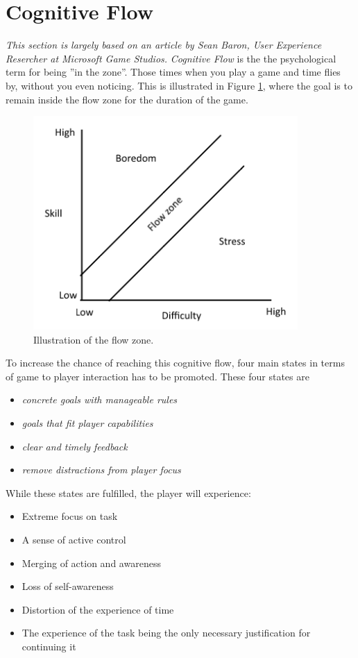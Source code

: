 \section{Cognitive Flow}\label{gamedesign:cognitiveflow}
\emph{This section is largely based on an article by Sean Baron, User Experience Resercher at Microsoft Game Studios\cite{baron}.}
\emph{Cognitive Flow} is the the psychological term for being ''in the zone''. Those times when you play a game and time flies by, without you even noticing. 
This is illustrated in Figure \ref{gamedesign:flowzone}, where the goal is to remain inside the flow zone for the duration of the game.
\begin{figure}
\includegraphics{figures/gamedesign/flowZone}
\caption{Illustration of the flow zone.}
\label{gamedesign:flowzone}
\end{figure}

To increase the chance of reaching this cognitive flow, four main states in terms of game to player interaction has to be promoted. 
These four states are 
\begin{itemize}
\item \emph{concrete goals with manageable rules}
\item \emph{goals that fit player capabilities}
\item \emph{clear and timely feedback}
\item \emph{remove distractions from player focus}
\end{itemize} While these states are fulfilled, the player will experience:

\begin{itemize}
\item Extreme focus on task
\item A sense of active control
\item Merging of action and awareness
\item Loss of self-awareness
\item Distortion of the experience of time
\item The experience of the task being the only necessary justification for continuing it
\end{itemize}

